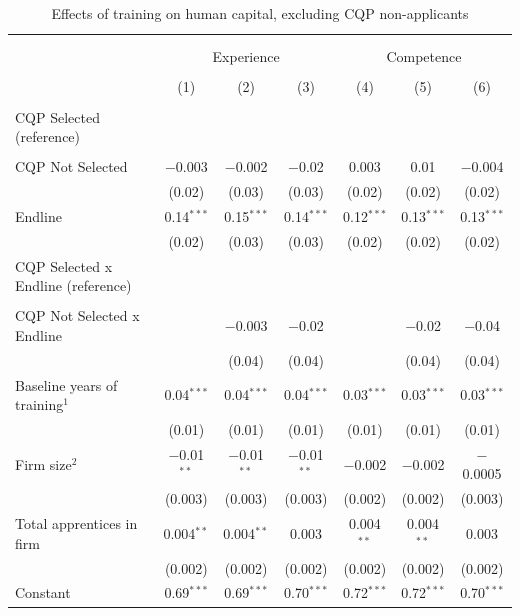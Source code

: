 \documentclass[
  a4paper, twoside, 12pt]{book}
\renewcommand{\hl}[1]{#1}
\begin{document}
\begin{singlespacing}

\begin{table}[H] \centering 
  \caption{Effects of training on human capital, excluding CQP non-applicants} 
  \label{tab:tbl-appreg2} 
\scriptsize 
\begin{tabular}{@{\extracolsep{-4pt}}lcccccc} 
\\[-1.8ex]\hline 
\hline \\[-1.8ex] 
\\[-1.8ex] & \multicolumn{3}{c}{Experience} & \multicolumn{3}{c}{Competence} \\ 
\\[-1.8ex] & (1) & (2) & (3) & (4) & (5) & (6)\\ 
\hline \\[-1.8ex] 
 CQP Selected (reference) \\ \\ CQP Not Selected & $-$0.003 & $-$0.002 & $-$0.02 & 0.003 & 0.01 & $-$0.004 \\ 
  & (0.02) & (0.03) & (0.03) & (0.02) & (0.02) & (0.02) \\ 
  Endline & 0.14$^{***}$ & 0.15$^{***}$ & 0.14$^{***}$ & 0.12$^{***}$ & 0.13$^{***}$ & 0.13$^{***}$ \\ 
  & (0.02) & (0.03) & (0.03) & (0.02) & (0.02) & (0.02) \\ 
  \hl{CQP Selected x Endline (reference)} \\ \\ \hl{CQP Not Selected x Endline} &  & $-$0.003 & $-$0.02 &  & $-$0.02 & $-$0.04 \\ 
  &  & (0.04) & (0.04) &  & (0.04) & (0.04) \\ 
  Baseline years of training$^1$ & 0.04$^{***}$ & 0.04$^{***}$ & 0.04$^{***}$ & 0.03$^{***}$ & 0.03$^{***}$ & 0.03$^{***}$ \\ 
  & (0.01) & (0.01) & (0.01) & (0.01) & (0.01) & (0.01) \\ 
  Firm size$^2$ & $-$0.01$^{**}$ & $-$0.01$^{**}$ & $-$0.01$^{**}$ & $-$0.002 & $-$0.002 & $-$0.0005 \\ 
  & (0.003) & (0.003) & (0.003) & (0.002) & (0.002) & (0.003) \\ 
  Total apprentices in firm & 0.004$^{**}$ & 0.004$^{**}$ & 0.003 & 0.004$^{**}$ & 0.004$^{**}$ & 0.003 \\ 
  & (0.002) & (0.002) & (0.002) & (0.002) & (0.002) & (0.002) \\ 
  Constant & 0.69$^{***}$ & 0.69$^{***}$ & 0.70$^{***}$ & 0.72$^{***}$ & 0.72$^{***}$ & 0.70$^{***}$ \\ 

\end{tabular}
\end{table}
\end{singlespacing}
\end{document}
